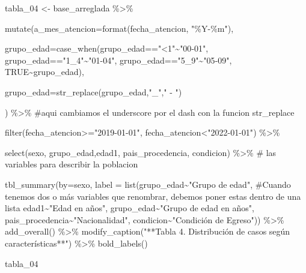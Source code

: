 \documentclass[
  letterpaper,
  DIV=11,
  numbers=noendperiod]{scrreprt}
\newenvironment{Shaded}{\begin{snugshade}}{\end{snugshade}}
\newcommand{\AttributeTok}[1]{\textcolor[rgb]{0.40,0.45,0.13}{#1}}
\newcommand{\CommentTok}[1]{\textcolor[rgb]{0.37,0.37,0.37}{#1}}
\newcommand{\ConstantTok}[1]{\textcolor[rgb]{0.56,0.35,0.01}{#1}}
\newcommand{\FunctionTok}[1]{\textcolor[rgb]{0.28,0.35,0.67}{#1}}
\newcommand{\NormalTok}[1]{\textcolor[rgb]{0.00,0.23,0.31}{#1}}
\newcommand{\OtherTok}[1]{\textcolor[rgb]{0.00,0.23,0.31}{#1}}
\newcommand{\SpecialCharTok}[1]{\textcolor[rgb]{0.37,0.37,0.37}{#1}}
\newcommand{\StringTok}[1]{\textcolor[rgb]{0.13,0.47,0.30}{#1}}
\begin{document}
\begin{Shaded}
\begin{Highlighting}[]
\NormalTok{tabla\_04 }\OtherTok{\textless{}{-}}\NormalTok{ base\_arreglada }\SpecialCharTok{\%\textgreater{}\%} 
  
\FunctionTok{mutate}\NormalTok{(}\AttributeTok{a\_mes\_atencion=}\FunctionTok{format}\NormalTok{(fecha\_atencion, }\StringTok{"\%Y{-}\%m"}\NormalTok{),}
       
       \AttributeTok{grupo\_edad=}\FunctionTok{case\_when}\NormalTok{(grupo\_edad}\SpecialCharTok{==}\StringTok{"\textless{}1"}\SpecialCharTok{\textasciitilde{}}\StringTok{"00{-}01"}\NormalTok{,}
\NormalTok{                            grupo\_edad}\SpecialCharTok{==}\StringTok{"1\_4"}\SpecialCharTok{\textasciitilde{}}\StringTok{"01{-}04"}\NormalTok{,}
\NormalTok{                            grupo\_edad}\SpecialCharTok{==}\StringTok{"5\_9"}\SpecialCharTok{\textasciitilde{}}\StringTok{"05{-}09"}\NormalTok{,}
                            \ConstantTok{TRUE}\SpecialCharTok{\textasciitilde{}}\NormalTok{grupo\_edad),}
       
       \AttributeTok{grupo\_edad=}\FunctionTok{str\_replace}\NormalTok{(grupo\_edad,}\StringTok{"\_"}\NormalTok{,}\StringTok{" {-} "}\NormalTok{)}
       
\NormalTok{       ) }\SpecialCharTok{\%\textgreater{}\%} \CommentTok{\#aqui cambiamos el underscore por el dash con la funcion str\_replace}
 
   \FunctionTok{filter}\NormalTok{(fecha\_atencion}\SpecialCharTok{\textgreater{}=}\StringTok{"2019{-}01{-}01"}\NormalTok{, fecha\_atencion}\SpecialCharTok{\textless{}}\StringTok{"2022{-}01{-}01"}\NormalTok{) }\SpecialCharTok{\%\textgreater{}\%}
  
  
  \FunctionTok{select}\NormalTok{(sexo, grupo\_edad,edad1, pais\_procedencia, condicion) }\SpecialCharTok{\%\textgreater{}\%}  \CommentTok{\# las variables para describir la poblacion}

  \FunctionTok{tbl\_summary}\NormalTok{(}\AttributeTok{by=}\NormalTok{sexo,}
             \AttributeTok{label =} \FunctionTok{list}\NormalTok{(grupo\_edad}\SpecialCharTok{\textasciitilde{}}\StringTok{"Grupo de edad"}\NormalTok{, }\CommentTok{\#Cuando tenemos dos o más variables que renombrar, debemos poner estas dentro de una lista}
\NormalTok{              edad1}\SpecialCharTok{\textasciitilde{}}\StringTok{"Edad en años"}\NormalTok{,}
\NormalTok{              grupo\_edad}\SpecialCharTok{\textasciitilde{}}\StringTok{"Grupo de edad en años"}\NormalTok{,}
\NormalTok{              pais\_procedencia}\SpecialCharTok{\textasciitilde{}}\StringTok{"Nacionalidad"}\NormalTok{,}
\NormalTok{              condicion}\SpecialCharTok{\textasciitilde{}}\StringTok{"Condición de Egreso"}\NormalTok{)) }\SpecialCharTok{\%\textgreater{}\%} 
  \FunctionTok{add\_overall}\NormalTok{() }\SpecialCharTok{\%\textgreater{}\%} 
  \FunctionTok{modify\_caption}\NormalTok{(}\StringTok{"**Tabla 4. Distribución de casos según características**"}\NormalTok{) }\SpecialCharTok{\%\textgreater{}\%} 
  \FunctionTok{bold\_labels}\NormalTok{()}

\NormalTok{tabla\_04}
\end{Highlighting}
\end{Shaded}
\end{document}
